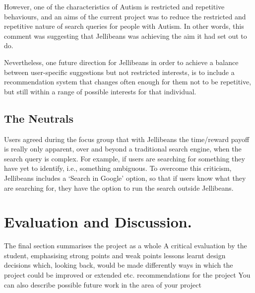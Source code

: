 \documentclass[a4paper, 11pt]{article}
\begin{document}
However, one of the characteristics of Autism is restricted and repetitive behaviours, and an aims of the current project was to reduce the restricted and repetitive nature of search queries for people with Autism. In other words, this comment was suggesting that Jellibeans was achieving the aim it had set out to do.

\vspace{5mm}
Nevertheless, one future direction for Jellibeans in order to achieve a balance between user-specific suggestions but not restricted interests, is to include a recommendation system that changes often enough for them not to be repetitive, but still within a range of possible interests for that individual. 

\subsection{The Neutrals}

Users agreed during the focus group that with Jellibeans the time/reward payoff is really only apparent, over and beyond a traditional search engine, when the search query is complex. For example, if users are searching for something they have yet to identify, i.e., something ambiguous. To overcome this criticism, Jellibeans includes a `Search in Google' option, so that if users know what they are searching for, they have the option to run the search outside Jellibeans.

\section{Evaluation and Discussion.}\label{eval}


The final section summarises the project as a whole
A critical evaluation by the student, emphasising
strong points and weak points
lessons learnt
design decisions which, looking back, would be made differently
ways in which the project could be improved or extended etc.
recommendations for the project
You can also describe possible future work in the area of your project
\end{document}
